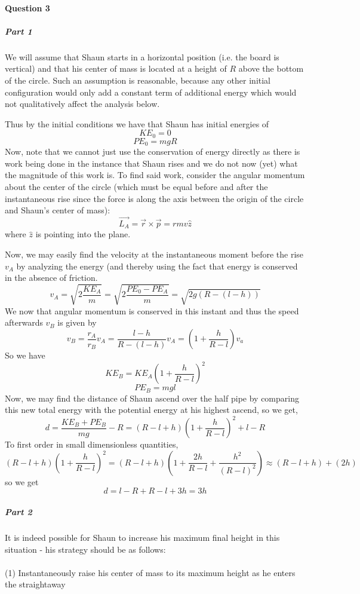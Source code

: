 \paragraph{Question 3}
\subparagraph{Part 1}
We will assume that Shaun starts in a horizontal position (i.e. the board is vertical) and that his center of mass is located at a height of $R$ above the bottom of the circle. Such an assumption is reasonable, because any other initial configuration would only add a constant term of additional energy which would not qualitatively affect the analysis below.

Thus by the initial conditions we have that Shaun has initial energies of
\[ KE_0 = 0 \]
\[ PE_0 = mgR \]
Now, note that we cannot just use the conservation of energy directly as there is work being done in the instance that Shaun rises and we do not now (yet) what the magnitude of this work is. To find said work, consider the angular momentum about the center of the circle (which must be equal before and after the instantaneous rise since the force is along the axis between the origin of the circle and Shaun's center of mass):
\[ \vec{L_A} = \vec r \times \vec p = rmv \hat{z} \]
where $\hat{z}$ is pointing into the plane. \par
Now, we may easily find the velocity at the instantaneous moment before the rise $v_A$ by analyzing the energy (and thereby using the fact that energy is conserved in the absence of friction.
\[ v_A=\sqrt{2\frac{KE_A}{m}} = \sqrt{2\frac{PE_0-PE_A}{m}} = \sqrt{2g(R-(l-h))}  \]
We now that angular momentum is conserved in this instant and thus the speed afterwards $v_B$ is given by
\[ v_B = \frac{r_A}{r_B} v_A = \frac{l-h}{R-(l-h)} v_A = \left(1+\frac{h}{R-l}\right) v_a \]
So we have
\[ KE_B = KE_A\left(1+\frac{h}{R-l}\right)^2 \]
\[ PE_B = mgl \]
Now, we may find the distance of Shaun ascend over the half pipe by comparing this new total energy with the potential energy at his highest ascend, so we get, 
\[ d=\frac{KE_B+PE_B}{mg}-R = \left(R-l+h\right)\left(1+\frac{h}{R-l}\right)^2+l-R\]
To first order in small dimensionless quantities, 
\[ \left(R-l+h\right)\left(1+\frac{h}{R-l}\right)^2 = \left(R-l+h\right) \left(1+\frac{2h}{R-l}+\frac{h^2}{(R-l)^2}\right) \approx (R-l+h)+(2h) \]
so we get
\[ d = l-R + R - l + 3h =3h \]
\subparagraph{Part 2}
It is indeed possible for Shaun to increase his maximum final height in this situation - his strategy should be as follows:
\\\\ (1) Instantaneously raise his center of mass to its maximum height as he enters the straightaway
